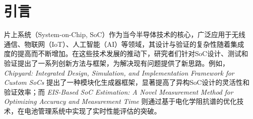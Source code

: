 \documentclass[12pt,hyperref,a4paper,UTF8]{ctexart}
\begin{document}

\cover

\newpage
\thispagestyle{empty}
\mbox{}

\newpage
\begin{abstract}
片上系统（System-on-Chip, SoC）技术作为现代电子领域的核心，集成了计算、通信、存储等多种功能，为物联网（IoT）、人工智能（AI）和5G通信等领域提供了重要支持。然而，随着SoC设计复杂性和集成度的提升，设计灵活性、验证效率和测试成本等问题日益突出。本文综述了SoC设计与测试领域的最新研究进展，包括Chipyard框架在模块化SoC设计中的应用、电化学阻抗谱（EIS）在电池管理系统实时性能优化中的作用，以及射频SoC测试库设计和IP核验证策略的创新。通过对这些研究的分析，本文总结了现有方法在应对关键问题方面的优势，如设计灵活性提升、验证时间缩短和测试效率优化。综述的内容为SoC技术的未来发展提供了参考方向，也为相关领域的进一步研究奠定了理论基础。


\vspace{1em}

\noindent
\textbf{关键词：} 片上系统，模块化设计，验证方法，电化学阻抗谱，射频测试，IP核集成
\end{abstract}

\thispagestyle{empty} %


\newpage
{}
\setcounter{page}{1}


\section{引言}

片上系统（System-on-Chip, SoC）作为当今半导体技术的核心，广泛应用于无线通信、物联网（IoT）、人工智能（AI）等领域，其设计与验证的复杂性随着集成度的提高而不断增加。在这些技术发展的推动下，研究者们针对SoC设计、测试和验证提出了一系列创新方法与框架，为解决现有问题提供了新思路。例如，\textit{Chipyard: Integrated Design, Simulation, and Implementation Framework for Custom SoCs} 提出了一种模块化生成器框架，显著提高了异构SoC设计的灵活性和验证效率\cite{9099108}；而 \textit{EIS-Based SoC Estimation: A Novel Measurement Method for Optimizing Accuracy and Measurement Time} 则通过基于电化学阻抗谱的优化技术，在电池管理系统中实现了实时性能评估的突破\cite{10227269}。
\end{document}
